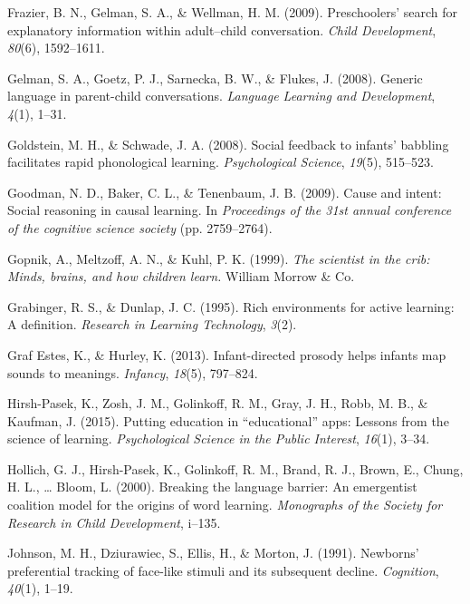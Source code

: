 \documentclass[a4paper,man,apacite,floatsintext]{apa6}
\begin{document}
\hypertarget{ref-frazier2009preschoolers}{}
Frazier, B. N., Gelman, S. A., \& Wellman, H. M. (2009). Preschoolers'
search for explanatory information within adult--child conversation.
\emph{Child Development}, \emph{80}(6), 1592--1611.

\hypertarget{ref-gelman2008generic}{}
Gelman, S. A., Goetz, P. J., Sarnecka, B. W., \& Flukes, J. (2008).
Generic language in parent-child conversations. \emph{Language Learning
and Development}, \emph{4}(1), 1--31.

\hypertarget{ref-goldstein2008social}{}
Goldstein, M. H., \& Schwade, J. A. (2008). Social feedback to infants'
babbling facilitates rapid phonological learning. \emph{Psychological
Science}, \emph{19}(5), 515--523.

\hypertarget{ref-goodman2009cause}{}
Goodman, N. D., Baker, C. L., \& Tenenbaum, J. B. (2009). Cause and
intent: Social reasoning in causal learning. In \emph{Proceedings of the
31st annual conference of the cognitive science society} (pp.
2759--2764).

\hypertarget{ref-gopnik1999scientist}{}
Gopnik, A., Meltzoff, A. N., \& Kuhl, P. K. (1999). \emph{The scientist
in the crib: Minds, brains, and how children learn.} William Morrow \&
Co.

\hypertarget{ref-grabinger1995rich}{}
Grabinger, R. S., \& Dunlap, J. C. (1995). Rich environments for active
learning: A definition. \emph{Research in Learning Technology},
\emph{3}(2).

\hypertarget{ref-graf2013infant}{}
Graf Estes, K., \& Hurley, K. (2013). Infant-directed prosody helps
infants map sounds to meanings. \emph{Infancy}, \emph{18}(5), 797--824.

\hypertarget{ref-hirsh2015putting}{}
Hirsh-Pasek, K., Zosh, J. M., Golinkoff, R. M., Gray, J. H., Robb, M.
B., \& Kaufman, J. (2015). Putting education in ``educational'' apps:
Lessons from the science of learning. \emph{Psychological Science in the
Public Interest}, \emph{16}(1), 3--34.

\hypertarget{ref-hollich2000breaking}{}
Hollich, G. J., Hirsh-Pasek, K., Golinkoff, R. M., Brand, R. J., Brown,
E., Chung, H. L., \ldots{} Bloom, L. (2000). Breaking the language
barrier: An emergentist coalition model for the origins of word
learning. \emph{Monographs of the Society for Research in Child
Development}, i--135.

\hypertarget{ref-johnson1991newborns}{}
Johnson, M. H., Dziurawiec, S., Ellis, H., \& Morton, J. (1991).
Newborns' preferential tracking of face-like stimuli and its subsequent
decline. \emph{Cognition}, \emph{40}(1), 1--19.
\end{document}
